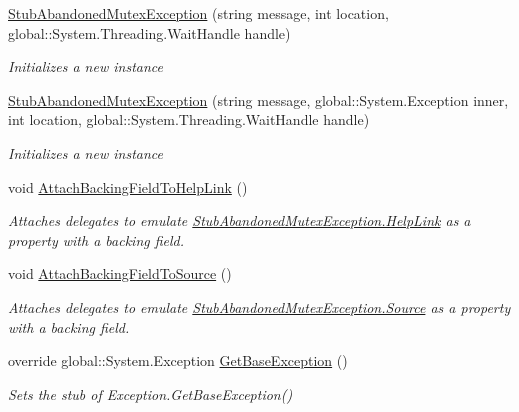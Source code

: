 \begin{DoxyCompactItemize}
\hyperlink{class_system_1_1_threading_1_1_fakes_1_1_stub_abandoned_mutex_exception_a626f9ca53300f4119856f6679a16f75e}{Stub\-Abandoned\-Mutex\-Exception} (string message, int location, global\-::\-System.\-Threading.\-Wait\-Handle handle)
\begin{DoxyCompactList}\small\item\em Initializes a new instance\end{DoxyCompactList}\item 
\hyperlink{class_system_1_1_threading_1_1_fakes_1_1_stub_abandoned_mutex_exception_a93bd67b902f2db84d9fdfbc76f107367}{Stub\-Abandoned\-Mutex\-Exception} (string message, global\-::\-System.\-Exception inner, int location, global\-::\-System.\-Threading.\-Wait\-Handle handle)
\begin{DoxyCompactList}\small\item\em Initializes a new instance\end{DoxyCompactList}\item 
void \hyperlink{class_system_1_1_threading_1_1_fakes_1_1_stub_abandoned_mutex_exception_acb52bfdaa7574f09d2a78d82f3fa1589}{Attach\-Backing\-Field\-To\-Help\-Link} ()
\begin{DoxyCompactList}\small\item\em Attaches delegates to emulate \hyperlink{class_system_1_1_threading_1_1_fakes_1_1_stub_abandoned_mutex_exception_a9d981a636be4f4ca89a76b1176671735}{Stub\-Abandoned\-Mutex\-Exception.\-Help\-Link} as a property with a backing field.\end{DoxyCompactList}\item 
void \hyperlink{class_system_1_1_threading_1_1_fakes_1_1_stub_abandoned_mutex_exception_a3c718ba10b63f64ee16ae3ca36b3f99a}{Attach\-Backing\-Field\-To\-Source} ()
\begin{DoxyCompactList}\small\item\em Attaches delegates to emulate \hyperlink{class_system_1_1_threading_1_1_fakes_1_1_stub_abandoned_mutex_exception_ad3befedffe22f6a684db8bb0bca84ba6}{Stub\-Abandoned\-Mutex\-Exception.\-Source} as a property with a backing field.\end{DoxyCompactList}\item 
override global\-::\-System.\-Exception \hyperlink{class_system_1_1_threading_1_1_fakes_1_1_stub_abandoned_mutex_exception_aa8dba822e650f873e7579c89f0fe9680}{Get\-Base\-Exception} ()
\begin{DoxyCompactList}\small\item\em Sets the stub of Exception.\-Get\-Base\-Exception()\end{DoxyCompactList}\item 

\end{DoxyCompactItemize}
